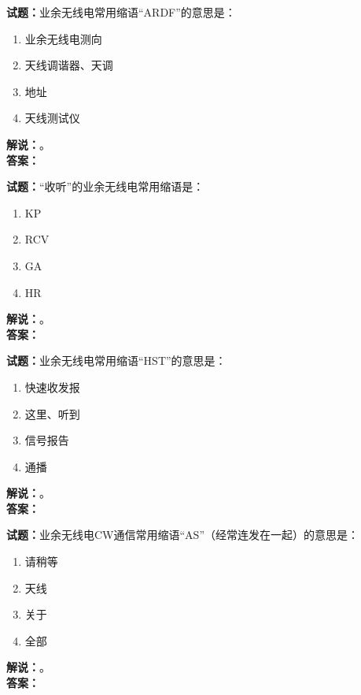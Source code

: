 \documentclass{ctexbook}
\begin{document}
\vspace{\baselineskip}

\noindent\textbf{试题：}业余无线电常用缩语“ARDF”的意思是：
\begin{enumerate}[leftmargin=3em]
  \item 业余无线电测向
  \item 天线调谐器、天调
  \item 地址
  \item 天线测试仪
\end{enumerate}
\noindent\textbf{解说：}\textbf{}。\\\noindent\textbf{答案：}

\vspace{\baselineskip}

\noindent\textbf{试题：}“收听”的业余无线电常用缩语是：
\begin{enumerate}[leftmargin=3em]
  \item KP
  \item RCV
  \item GA
  \item HR
\end{enumerate}
\noindent\textbf{解说：}\textbf{}。\\\noindent\textbf{答案：}

\vspace{\baselineskip}

\noindent\textbf{试题：}业余无线电常用缩语“HST”的意思是：
\begin{enumerate}[leftmargin=3em]
  \item 快速收发报
  \item 这里、听到
  \item 信号报告
  \item 通播
\end{enumerate}
\noindent\textbf{解说：}\textbf{}。\\\noindent\textbf{答案：}

\vspace{\baselineskip}

\noindent\textbf{试题：}业余无线电CW通信常用缩语“AS”（经常连发在一起）的意思是：
\begin{enumerate}[leftmargin=3em]
  \item 请稍等
  \item 天线
  \item 关于
  \item 全部
\end{enumerate}
\noindent\textbf{解说：}\textbf{}。\\\noindent\textbf{答案：}
\end{document}
